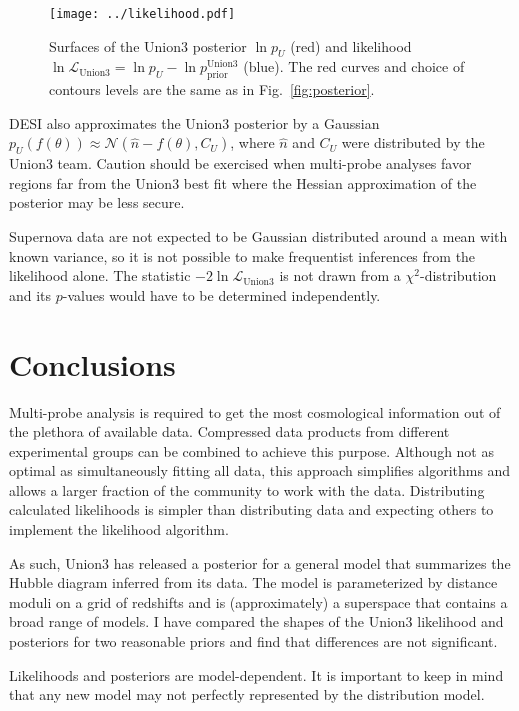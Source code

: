 \documentclass{aastex631}
\begin{document}
\begin{figure}[htbp] %
   \centering
   \texttt{[image: ../likelihood.pdf]} 
   \caption{Surfaces of the Union3 posterior $\ln{p_U}$ (red) and likelihood $\ln{\mathcal{L}_\text{Union3}}  = \ln{p_U}-\ln{p_\text{prior}^\text{Union3}}$ (blue).   The red curves
   and choice of contours levels are the same as in Fig.~\ref{fig:posterior}.\label{fig:likelihood}}
\end{figure}

DESI also approximates the Union3 posterior by a Gaussian ${p_U(f(\theta))} \approx \mathcal{N}( \hat{n}-f(\theta) , C_U)$,
where $\hat{n}$ and $C_U$ were distributed by the Union3 team.
Caution should be exercised when multi-probe analyses favor regions far from the Union3 best fit  where the Hessian approximation of the
posterior may be less secure.

Supernova data are not expected to be Gaussian distributed around a mean with known variance, so it is not possible
to make frequentist inferences from the likelihood alone.  The statistic
$-2\ln{\mathcal{L}_\text{Union3}}$  is not drawn from a $\chi^2$-distribution and its $p$-values would have to be determined
independently.

\section{Conclusions}
\label{sec:conclusions}
Multi-probe  analysis is required to get the most cosmological information out of the plethora of available data. 
Compressed data products from different experimental groups can be combined to achieve this purpose.
Although not as optimal as simultaneously fitting all data, this approach simplifies algorithms and allows a larger
fraction of
the community to work with the data.  Distributing calculated likelihoods is simpler than distributing data and expecting others to implement the likelihood algorithm.

As such, Union3 has released a posterior for a general model that summarizes the Hubble diagram inferred from its data.
The model is parameterized by distance moduli on a grid of redshifts and is (approximately) a superspace that
contains a broad range of models.    I have compared the shapes of the Union3 likelihood and posteriors for two
reasonable priors and find that differences are not significant.

Likelihoods and posteriors are model-dependent.  It is important to keep in mind that any new model may not perfectly represented by the 
distribution model.
\end{document}
